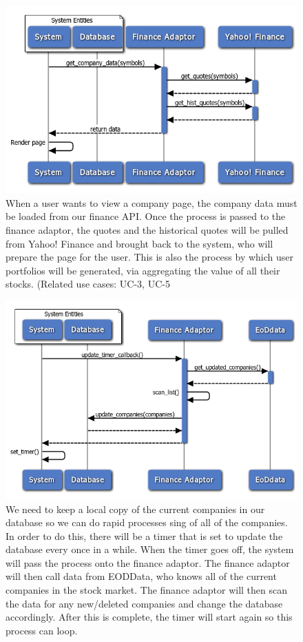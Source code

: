 \begin{figure}
\centering
\includegraphics[width=5.5in]{./Diagrams/InteractionDiagrams/rendercompanypage.png}
\caption{When a user wants to view a company page, the company data must be loaded from our finance API. Once the process is passed to the finance adaptor, the quotes and the historical quotes will be pulled from Yahoo! Finance and brought back to the system, who will prepare the page for the user. This is also the process by which user portfolios will be generated, via aggregating the value of all their stocks. (Related use cases: UC-3, UC-5}
\end{figure}

\begin{figure}
\centering
\includegraphics[width=5.5in]{./Diagrams/InteractionDiagrams/updatingdatabase.png}
\caption{We need to keep a local copy of the current companies in our database so we can do rapid processes sing of all of the companies. In order to do this, there will be a timer that is set to update the database every once in a while. When the timer goes off, the system will pass the process onto the finance adaptor. The finance adaptor will then call data from EODData, who knows all of the current companies in the stock market. The finance adaptor will then scan the data for any new/deleted companies and change the database accordingly. After this is complete, the timer will start again so this process can loop.}
\end{figure}
